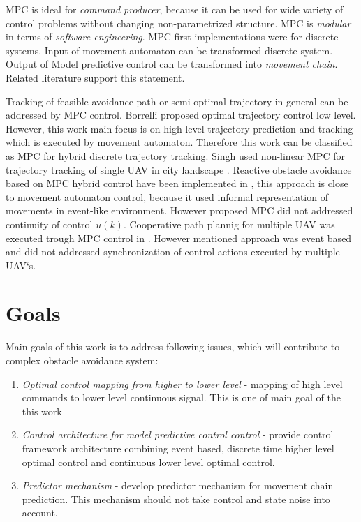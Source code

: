 MPC is ideal for \textit{command producer}, because it can be used for wide variety of control problems without changing non-parametrized structure. MPC is \textit{modular} in terms of \textit{software engineering}. MPC first implementations were for discrete systems. Input of movement automaton can be transformed discrete system.  Output of Model predictive control can be transformed into \textit{movement chain}. Related literature support this statement.

Tracking of feasible avoidance path or semi-optimal trajectory in general can be addressed by MPC control. Borrelli \cite{borrelli2006mpc} proposed optimal trajectory control low level. However, this work main focus is on high level trajectory prediction and tracking which is executed by movement automaton. Therefore this work can be classified as MPC for hybrid discrete trajectory tracking. Singh used non-linear MPC for trajectory tracking of single UAV in city landscape \cite{singh2001trajectory}. Reactive obstacle avoidance based on MPC hybrid control have been implemented in \cite{shim2007evasive}, this approach is close to movement automaton control, because it used informal representation of movements in event-like environment. However proposed MPC did not addressed continuity of control $u(k)$. Cooperative path plannig for multiple UAV was executed trough MPC control in \cite{wang2007cooperative}. However mentioned approach was event based and did not addressed synchronization of control actions executed by multiple UAV`s.

\section{Goals}\noindent
Main goals of this work is to address following issues, which will contribute to complex obstacle avoidance system:
\begin{enumerate}
    \item\textit{Optimal control mapping from higher to lower level} - mapping of high level commands to lower level continuous signal. This is one of main goal of the this work
    \item\textit{Control architecture for model predictive control control} - provide control framework architecture combining event based, discrete time higher level optimal control and continuous lower level optimal control.
    \item\textit{Predictor mechanism} - develop predictor mechanism for movement chain prediction. This mechanism should not take control and state noise into account.
\end{enumerate}

